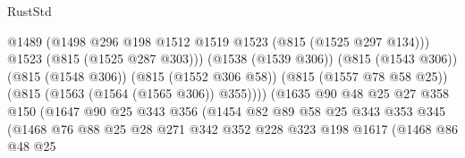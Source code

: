 \begin{lexlean}{RustStd}
\begin{coremodule}
                                          @1489
                                          (@1498
                                            @296
                                            @198
                                            @1512
                                            @1519
                                            @1523
                                            (@815 (@1525 @297 @134)))
                                          @1523
                                          (@815 (@1525 @287 @303)))
                                        (@1538 (@1539 @306))
                                        (@815 (@1543 @306))
                                        (@815 (@1548 @306))
                                        (@815 (@1552 @306 @58))
                                        (@815 (@1557 @78 @58 @25))
                                        (@815 (@1563 (@1564 (@1565 @306)) @355))))
                                    (@1635
                                      @90
                                      @48
                                      @25
                                      @27
                                      @358
                                      @150
                                      (@1647
                                        @90
                                        @25
                                        @343
                                        @356
                                        (@1454
                                          @82
                                          @89
                                          @58
                                          @25
                                          @343
                                          @353
                                          @345
                                          (@1468
                                            @76
                                            @88
                                            @25
                                            @28
                                            @271
                                            @342
                                            @352
                                            @228
                                            @323
                                            @198
                                            @1617
                                            (@1468
                                              @86
                                              @48
                                              @25

\end{coremodule}
\end{lexlean}
